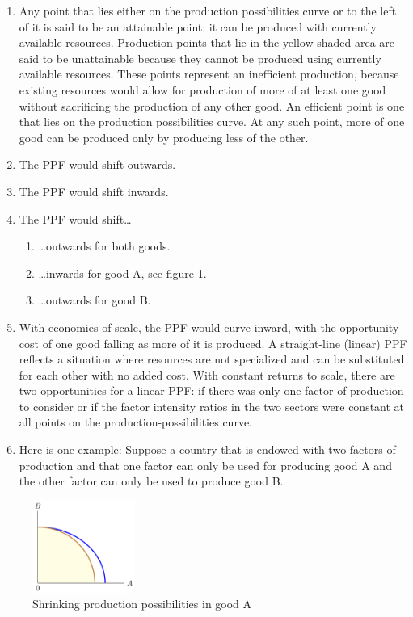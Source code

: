\documentclass[
  12pt,
  oneside]{book}
\providecommand{\tightlist}{%
  \setlength{\itemsep}{0pt}\setlength{\parskip}{0pt}}
\theoremstyle{definition}
\theoremstyle{definition}
\theoremstyle{definition}
\theoremstyle{definition}
\theoremstyle{remark}
\begin{document}
\begin{enumerate}
\def\labelenumi{\alph{enumi})}
\item
  Any point that lies either on the production possibilities curve or to the left of it is said to be an attainable point: it can be produced with currently available resources. Production points that lie in the yellow shaded area are said to be unattainable because they cannot be produced using currently available resources. These points represent an inefficient production, because existing resources would allow for production of more of at least one good without sacrificing the production of any other good. An efficient point is one that lies on the production possibilities curve. At any such point, more of one good can be produced only by producing less of the other.
\item
  The PPF would shift outwards.
\item
  The PPF would shift inwards.\\
\item
  The PPF would shift\ldots{}

  \begin{enumerate}
  \def\labelenumii{\roman{enumii})}
  \tightlist
  \item
    \ldots outwards for both goods.
  \item
    \ldots inwards for good A, see figure \ref{fig:ppf4}.
  \item
    \ldots outwards for good B.
  \end{enumerate}
\item
  With economies of scale, the PPF would curve inward, with the opportunity cost of one good falling as more of it is produced. A straight-line (linear) PPF reflects a situation where resources are not specialized and can be substituted for each other with no added cost. With constant returns to scale, there are two opportunities for a linear PPF: if there was only one factor of production to consider or if the factor intensity ratios in the two sectors were constant at all points on the production-possibilities curve.
\item
  Here is one example: Suppose a country that is endowed with two factors of production and that one factor can only be used for producing good A and the other factor can only be used to produce good B.
\end{enumerate}

\begin{figure}
\centering
\includegraphics[width=0.3\textwidth,height=\textheight]{fig/ppf4.png}
\caption{\label{fig:ppf4} Shrinking production possibilities in good A}
\end{figure}
\end{document}
